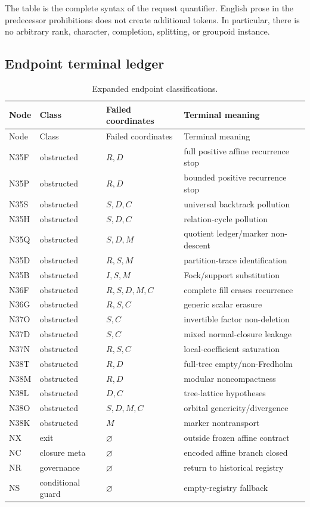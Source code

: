 The table is the complete syntax of the request quantifier.  English prose in
the predecessor prohibitions does not create additional tokens.  In particular,
there is no arbitrary rank, character, completion, splitting, or groupoid
instance.

\subsection{Endpoint terminal ledger}

\begin{longtable}{@{}L{1.6cm}L{2.3cm}L{3.0cm}L{7.0cm}@{}}
\caption{Expanded endpoint classifications.}\label{tab:endpoints}\\
\toprule
Node & Class & Failed coordinates & Terminal meaning \\
\midrule
\endfirsthead
\toprule
Node & Class & Failed coordinates & Terminal meaning \\
\midrule
\endhead
N35F & obstructed & $R,D$ & full positive affine recurrence stop \\
N35P & obstructed & $R,D$ & bounded positive recurrence stop \\
N35S & obstructed & $S,D,C$ & universal backtrack pollution \\
N35H & obstructed & $S,D,C$ & relation-cycle pollution \\
N35Q & obstructed & $S,D,M$ & quotient ledger/marker non-descent \\
N35D & obstructed & $R,S,M$ & partition-trace identification \\
N35B & obstructed & $I,S,M$ & Fock/support substitution \\
N36F & obstructed & $R,S,D,M,C$ & complete fill erases recurrence \\
N36G & obstructed & $R,S,C$ & generic scalar erasure \\
N37O & obstructed & $S,C$ & invertible factor non-deletion \\
N37D & obstructed & $S,C$ & mixed normal-closure leakage \\
N37N & obstructed & $R,S,C$ & local-coefficient saturation \\
N38T & obstructed & $R,D$ & full-tree empty/non-Fredholm \\
N38M & obstructed & $R,D$ & modular noncompactness \\
N38L & obstructed & $D,C$ & tree-lattice hypotheses \\
N38O & obstructed & $S,D,M,C$ & orbital genericity/divergence \\
N38K & obstructed & $M$ & marker nontransport \\
NX & exit & $\varnothing$ & outside frozen affine contract \\
NC & closure meta & $\varnothing$ & encoded affine branch closed \\
NR & governance & $\varnothing$ & return to historical registry \\
NS & conditional guard & $\varnothing$ & empty-registry fallback \\
\bottomrule
\end{longtable}

